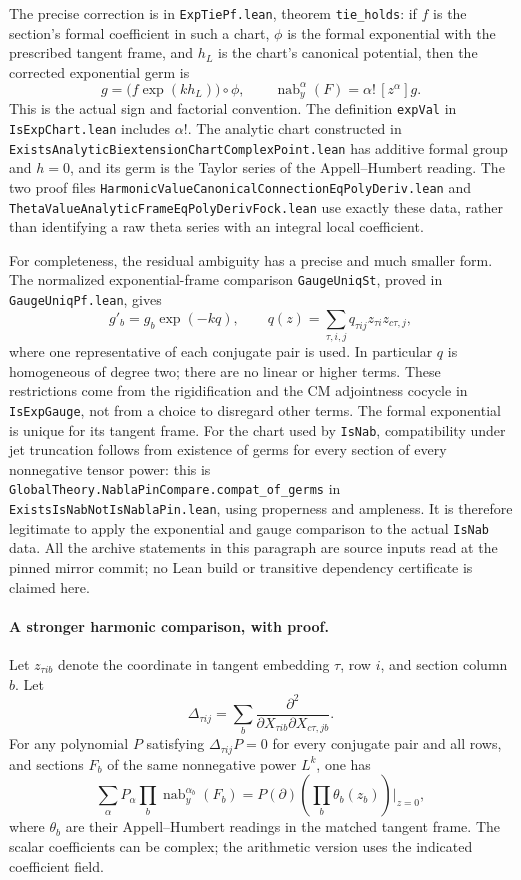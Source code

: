 The precise correction is in
\texttt{ExpTiePf.lean}, theorem \texttt{tie\_holds}: if $f$ is the
section's formal coefficient in such a chart, $\phi$ is the formal
exponential with the prescribed tangent frame, and $h_L$ is the
chart's canonical potential, then the corrected exponential germ
is
\[
       g=\bigl(f\exp(kh_L)\bigr)\circ\phi,
 \qquad
       \operatorname{nab}_y^\alpha(F)=\alpha!\,[z^\alpha]g.
 \tag{A8c}
\]
This is the actual sign and factorial convention.  The definition
\texttt{expVal} in \texttt{IsExpChart.lean} includes $\alpha!$.
The analytic chart constructed in
\texttt{ExistsAnalyticBiextensionChartComplexPoint.lean} has
additive formal group and $h=0$, and its germ is the Taylor series
of the Appell--Humbert reading.  The two proof files
\texttt{HarmonicValueCanonicalConnectionEqPolyDeriv.lean} and
\texttt{ThetaValueAnalyticFrameEqPolyDerivFock.lean} use exactly
these data, rather than identifying a raw theta series with an
integral local coefficient.

For completeness, the residual ambiguity has a precise and much
smaller form.  The normalized exponential-frame comparison
\texttt{GaugeUniqSt}, proved in \texttt{GaugeUniqPf.lean}, gives
\[
       g'_b=g_b\exp(-kq),\qquad
 q(z)=\sum_{\tau,i,j}q_{\tau ij}z_{\tau i}z_{c\tau,j},
 \tag{A8d}
\]
where one representative of each conjugate pair is used.
In particular $q$ is homogeneous of degree two; there are no
linear or higher terms.  These restrictions come from the
rigidification and the CM adjointness cocycle in
\texttt{IsExpGauge}, not from a choice to disregard other terms.
The formal exponential is unique for its tangent frame.
For the chart used by \texttt{IsNab}, compatibility under jet
truncation follows from existence of germs for every section of
every nonnegative tensor power: this is
\texttt{GlobalTheory.NablaPinCompare.compat\_of\_germs} in
\texttt{ExistsIsNabNotIsNablaPin.lean}, using properness and
ampleness.  It is therefore legitimate to apply the exponential
and gauge comparison to the actual \texttt{IsNab} data.  All the
archive statements in this paragraph are source inputs read at
the pinned mirror commit; no Lean build or transitive dependency
certificate is claimed here.

\paragraph{A stronger harmonic comparison, with proof.}
Let $z_{\tau i b}$ denote the coordinate in tangent embedding
$\tau$, row $i$, and section column $b$.  Let
\[
 \Delta_{\tau ij}
     =\sum_b
       \frac{\partial^2}
       {\partial X_{\tau i b}\partial X_{c\tau,jb}}.
\]
For any polynomial $P$ satisfying
$\Delta_{\tau ij}P=0$ for every conjugate pair and all rows, and
sections $F_b$ of the same nonnegative power $L^k$, one has
\[
 \sum_\alpha P_\alpha
      \prod_b\operatorname{nab}_y^{\alpha_b}(F_b)
   =P(\partial)\left(\prod_b\theta_b(z_b)\right)\bigg|_{z=0},
 \tag{A8e}
\]
where $\theta_b$ are their Appell--Humbert readings in the matched
tangent frame.  The scalar coefficients can be complex; the
arithmetic version uses the indicated coefficient field.

